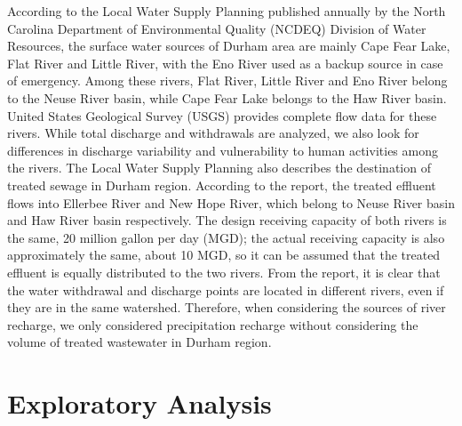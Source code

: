 \documentclass[
  12pt,
]{article}
\newenvironment{Shaded}{\begin{snugshade}}{\end{snugshade}}
\newcommand{\AttributeTok}[1]{\textcolor[rgb]{0.77,0.63,0.00}{#1}}
\newcommand{\CommentTok}[1]{\textcolor[rgb]{0.56,0.35,0.01}{\textit{#1}}}
\newcommand{\DecValTok}[1]{\textcolor[rgb]{0.00,0.00,0.81}{#1}}
\newcommand{\FunctionTok}[1]{\textcolor[rgb]{0.00,0.00,0.00}{#1}}
\newcommand{\NormalTok}[1]{#1}
\newcommand{\OtherTok}[1]{\textcolor[rgb]{0.56,0.35,0.01}{#1}}
\newcommand{\SpecialCharTok}[1]{\textcolor[rgb]{0.00,0.00,0.00}{#1}}
\newcommand{\StringTok}[1]{\textcolor[rgb]{0.31,0.60,0.02}{#1}}
\begin{document}
According to the Local Water Supply Planning published annually by the
North Carolina Department of Environmental Quality (NCDEQ) Division of
Water Resources, the surface water sources of Durham area are mainly
Cape Fear Lake, Flat River and Little River, with the Eno River used as
a backup source in case of emergency. Among these rivers, Flat River,
Little River and Eno River belong to the Neuse River basin, while Cape
Fear Lake belongs to the Haw River basin. United States Geological
Survey (USGS) provides complete flow data for these rivers. While total
discharge and withdrawals are analyzed, we also look for differences in
discharge variability and vulnerability to human activities among the
rivers. The Local Water Supply Planning also describes the destination
of treated sewage in Durham region. According to the report, the treated
effluent flows into Ellerbee River and New Hope River, which belong to
Neuse River basin and Haw River basin respectively. The design receiving
capacity of both rivers is the same, 20 million gallon per day (MGD);
the actual receiving capacity is also approximately the same, about 10
MGD, so it can be assumed that the treated effluent is equally
distributed to the two rivers. From the report, it is clear that the
water withdrawal and discharge points are located in different rivers,
even if they are in the same watershed. Therefore, when considering the
sources of river recharge, we only considered precipitation recharge
without considering the volume of treated wastewater in Durham region.

\newpage

\hypertarget{exploratory-analysis}{%
\section{Exploratory Analysis}\label{exploratory-analysis}}

\begin{Shaded}
\end{Shaded}
\end{document}
